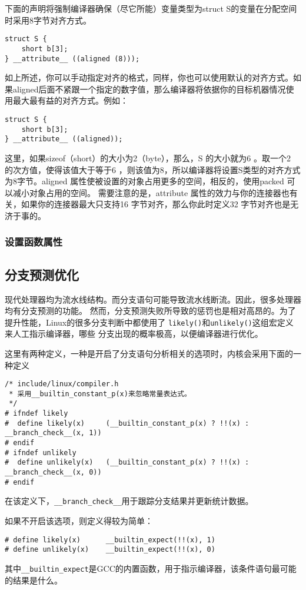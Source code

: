 				下面的声明将强制编译器确保（尽它所能）变量类型为struct S的变量在分配空间时采用8字节对齐方式。				
\begin{verbatim}
struct S {
	short b[3];
} __attribute__ ((aligned (8)));
\end{verbatim}

			如上所述，你可以手动指定对齐的格式，同样，你也可以使用默认的对齐方式。如果aligned后面不紧跟一个指定的数字值，那么编译器将依据你的目标机器情况使用最大最有益的对齐方式。例如：

\begin{verbatim}
struct S {
	short b[3];
} __attribute__ ((aligned));
\end{verbatim}

			这里，如果sizeof（short）的大小为2（byte），那么，S 的大小就为6 。取一个2 的次方值，使得该值大于等于6 ，则该值为8，所以编译器将设置S类型的对齐方式为8字节。aligned 属性使被设置的对象占用更多的空间，相反的，使用packed 可以减小对象占用的空间。
			需要注意的是，attribute 属性的效力与你的连接器也有关，如果你的连接器最大只支持16 字节对齐，那么你此时定义32 字节对齐也是无济于事的。

			\subsubsection{设置函数属性}
	\subsection{分支预测优化}
		\label{GCC:likely && unlikely}
		现代处理器均为流水线结构。而分支语句可能导致流水线断流。因此，很多处理器均有分支预测的功能。
然而，分支预测失败所导致的惩罚也是相对高昂的。为了提升性能，Linux的很多分支判断中都使用了
\texttt{likely()}和\texttt{unlikely()}这组宏定义来人工指示编译器，哪些
分支出现的概率极高，以便编译器进行优化。

		这里有两种定义，一种是开启了分支语句分析相关的选项时，内核会采用下面的一种定义
\begin{verbatim}
/* include/linux/compiler.h
 * 采用__builtin_constant_p(x)来忽略常量表达式。
 */
# ifndef likely
#  define likely(x)     (__builtin_constant_p(x) ? !!(x) : __branch_check__(x, 1))
# endif
# ifndef unlikely
#  define unlikely(x)   (__builtin_constant_p(x) ? !!(x) : __branch_check__(x, 0))
# endif
\end{verbatim}

		在该定义下，\texttt{__branch_check__}用于跟踪分支结果并更新统计数据。

		如果不开启该选项，则定义得较为简单：
\begin{verbatim}
# define likely(x)      __builtin_expect(!!(x), 1)
# define unlikely(x)    __builtin_expect(!!(x), 0)
\end{verbatim}
其中\texttt{__builtin_expect}是GCC的内置函数，用于指示编译器，该条件语句最可能的结果是什么。

